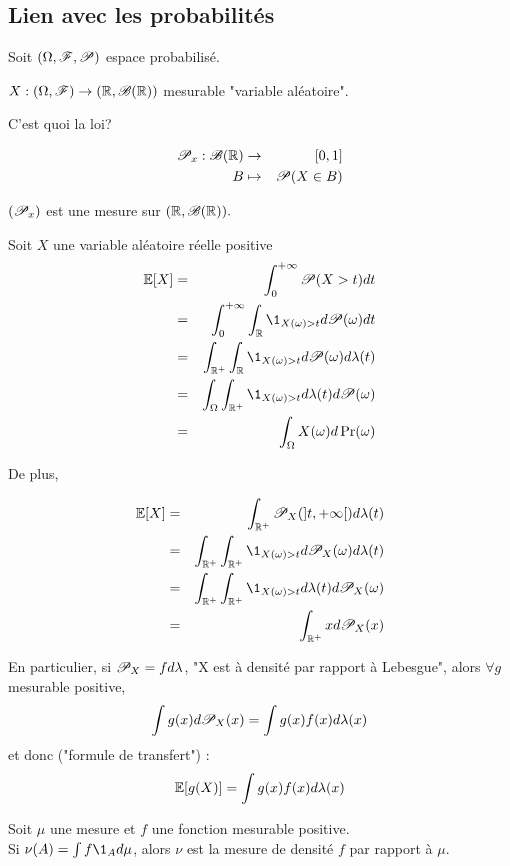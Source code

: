 \subsection{Lien avec les probabilités}




Soit $(\Omega, \mathscr{F}, \mathscr{P})$ espace probabilisé.

$X : (\Omega,    \mathscr{F}) \to (\mathbb{R},  \mathscr{B}(\mathbb{R})) $ mesurable "variable aléatoire".

C'est quoi la loi?

\begin{eqnarray*}
    \mathscr{P}_x: \mathscr{B} (\mathbb{R}) &\to& [0,1] \\
	B &\mapsto& \mathscr{P}(X  \in B)
\end{eqnarray*}

$(\mathscr{P}_x)$ est une mesure sur $(\mathbb{R},  \mathscr{B}(\mathbb{R})).$

Soit $X$ une variable aléatoire réelle positive\\
\begin{eqnarray*}
	\E[X] &=& \int_0^{+\infty} \Pro (X> t) d t\\
	&=& \int_0^{+\infty}\int_\R \1_{X(\omega)>t}d \Pro (\omega) d t\\
	&=& \int_{\R^+} \int_{\R} \1_{X(\omega)>t}d \Pro (\omega) d \lambda(t) \\ %
	&=& \int_{\Omega} \int_{\R^+} \1_{X(\omega)>t}d \lambda(t) d \Pro (\omega)  \\%
	&=& \int_{\Omega} X(\omega) d \Pr(\omega)
\end{eqnarray*}

De plus,


\begin{eqnarray*}
	\E[X] &=& \int_{\R^+} \Pro_X(]t, +\infty[) d \lambda (t) \\
	&=& \int_{\R^+} \int_{\R^+} \1_{X(\omega)>t}d \Pro_X (\omega) d \lambda(t) \\
	&=& \int_{\R^+} \int_{\R^+} \1_{X(\omega)>t}d \lambda(t) d\Pro_X (\omega)  \\ %
	&=& \int_{\R^+} x d\Pro_X (x)
\end{eqnarray*}

En particulier, si $\mathscr{P}_X = fd\lambda$, "X est à densité par rapport à Lebesgue", alors $\forall g$ mesurable positive,
$$\int g(x) d \mathscr{P}_X(x) = \int g(x) f(x) d \lambda(x)$$
et donc ("formule de transfert") :
$$ \mathbb{E}[g(X)] = \int g(x) f(x) d \lambda(x)$$

\begin{example}
	Soit $\mu$ une mesure et $f$ une fonction mesurable positive.\\
	Si $\nu(A) = \int f \1_A d \mu$, alors $\nu$ est la mesure de densité $f$ par rapport à $\mu$.
\end{example}


